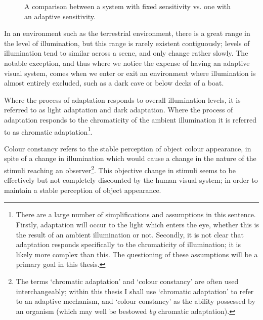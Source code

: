 \begin{figure}[htbp]
\caption{A comparison between a system with fixed sensitivity vs. one with an adaptive sensitivity.}
\label{fig:adaptation}
\end{figure}

In an environment such as the terrestrial environment, there is a great range in the level of illumination, but this range is rarely existent contiguously; levels of illumination tend to similar across a scene, and only change rather slowly. The notable exception, and thus where we notice the expense of having an adaptive visual system, comes when we enter or exit an environment where illumination is almost entirely excluded, such as a dark cave or below decks of a boat. 

Where the process of adaptation responds to overall illumination levels, it is referred to as light adaptation and dark adaptation. Where the process of adaptation responds to the chromaticity of the ambient illumination it is referred to as chromatic adaptation\footnote{There are a large number of simplifications and assumptions in this sentence. Firstly, adaptation will occur to the light which enters the eye, whether this is the result of an ambient illumination or not. Secondly, it is not clear that adaptation responds specifically to the chromaticity of illumination; it is likely more complex than this. The questioning of these assumptions will be a primary goal in this thesis.}.

Colour constancy refers to the stable perception of object colour appearance, in spite of a change in illumination which would cause a change in the nature of the stimuli reaching an observer\footnote{The terms `chromatic adaptation' and `colour constancy' are often used interchangeably; within this thesis I shall use `chromatic adaptation' to refer to an adaptive mechanism, and `colour constancy' as the ability possessed by an organism (which may well be bestowed \emph{by} chromatic adaptation).}. This objective change in stimuli seems to be effectively but not completely discounted by the human visual system; in order to maintain a stable perception of object appearance. 

